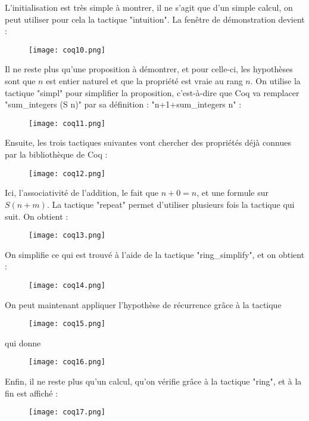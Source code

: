 L'initialisation est très simple à montrer, il ne s'agit que d'un simple calcul, on peut utiliser pour cela la tactique "intuition". La fenêtre de démonstration devient :
\begin{figure}[!ht]
\centering
\texttt{[image: coq10.png]}
\end{figure}

Il ne reste plus qu'une proposition à démontrer, et pour celle-ci, les hypothèses sont que $n$ est entier naturel et que la propriété est vraie au rang $n$. On utilise la tactique "simpl" pour simplifier la proposition, c'est-à-dire que Coq va remplacer "sum\_integers (S n)" par sa définition : "n+1+sum\_integers n" : 

\begin{figure}[!ht]
\centering
\texttt{[image: coq11.png]}
\end{figure}

Ensuite, les trois tactiques suivantes vont chercher des propriétés déjà connues par la bibliothèque de Coq : 
\begin{figure}[!ht]
\centering
\texttt{[image: coq12.png]}
\end{figure}

Ici, l'associativité de l'addition, le fait que $n+0=n$, et une formule sur $S (n+m)$. La tactique "repeat" permet d'utiliser plusieurs fois la tactique qui suit.  On obtient :
\begin{figure}[!ht]
\centering
\texttt{[image: coq13.png]}
\end{figure}

On simplifie ce qui est trouvé à l'aide de la tactique "ring\_simplify", et on obtient :\newpage
\begin{figure}[!ht]
\centering
\texttt{[image: coq14.png]}
\end{figure}

On peut maintenant appliquer l'hypothèse de récurrence grâce à la tactique 

\begin{figure}[!ht]
\centering
\texttt{[image: coq15.png]}
\end{figure}

qui donne

 \begin{figure}[!ht]
\centering
\texttt{[image: coq16.png]}
\end{figure}

Enfin, il ne reste plus qu'un calcul, qu'on vérifie grâce à la tactique "ring", et à la fin est affiché : 
\begin{figure}[!ht]
\centering
\texttt{[image: coq17.png]}
\end{figure}


